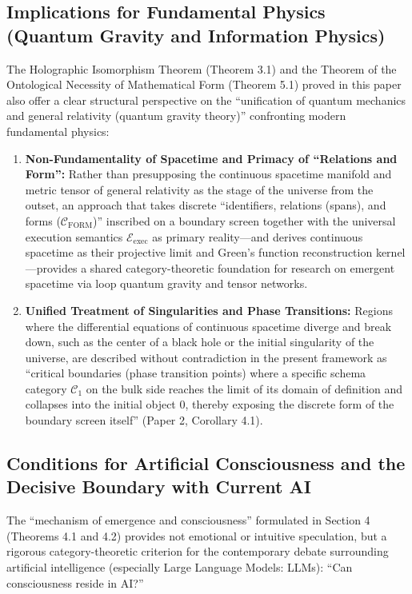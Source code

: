 \documentclass[11pt,a4paper]{article}
\theoremstyle{definition}
\theoremstyle{plain}
\begin{document}
\subsection{Implications for Fundamental Physics (Quantum Gravity and Information Physics)}
The Holographic Isomorphism Theorem (Theorem 3.1) and the Theorem of the Ontological Necessity of Mathematical Form (Theorem 5.1) proved in this paper also offer a clear structural perspective on the ``unification of quantum mechanics and general relativity (quantum gravity theory)'' confronting modern fundamental physics:

\begin{enumerate}
    \item \textbf{Non-Fundamentality of Spacetime and Primacy of ``Relations and Form'':}
    Rather than presupposing the continuous spacetime manifold and metric tensor of general relativity as the stage of the universe from the outset, an approach that takes discrete ``identifiers, relations (spans), and forms ($\mathcal{C}_{\mathrm{FORM}}$)'' inscribed on a boundary screen together with the universal execution semantics $\mathcal{E}_{\mathrm{exec}}$ as primary reality---and derives continuous spacetime as their projective limit and Green's function reconstruction kernel---provides a shared category-theoretic foundation for research on emergent spacetime via loop quantum gravity and tensor networks.
    \item \textbf{Unified Treatment of Singularities and Phase Transitions:}
    Regions where the differential equations of continuous spacetime diverge and break down, such as the center of a black hole or the initial singularity of the universe, are described without contradiction in the present framework as ``critical boundaries (phase transition points) where a specific schema category $\mathcal{C}_1$ on the bulk side reaches the limit of its domain of definition and collapses into the initial object $0$, thereby exposing the discrete form of the boundary screen itself'' (Paper 2, Corollary 4.1).
\end{enumerate}

\subsection{Conditions for Artificial Consciousness and the Decisive Boundary with Current AI}
The ``mechanism of emergence and consciousness'' formulated in Section 4 (Theorems 4.1 and 4.2) provides not emotional or intuitive speculation, but a rigorous category-theoretic criterion for the contemporary debate surrounding artificial intelligence (especially Large Language Models: LLMs): ``Can consciousness reside in AI?''
\end{document}
